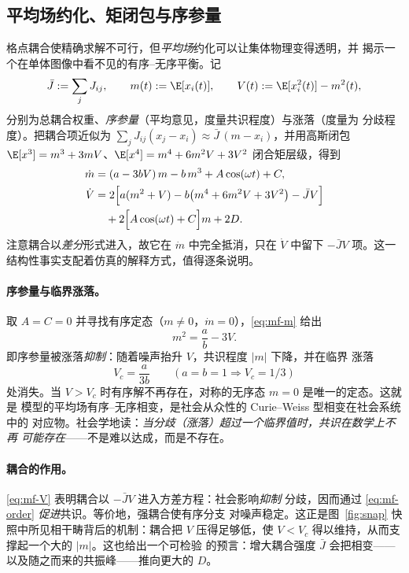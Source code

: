 \subsection{平均场约化、矩闭包与序参量}
\label{sec:theory-mf}
格点耦合使精确求解不可行，但\emph{平均场}约化可以让集体物理变得透明，并
揭示一个在单体图像中看不见的有序--无序平衡。记
\begin{equation}
  \bar J:=\sum_j J_{ij},\qquad
  m(t):=\E[x_i(t)],\qquad
  V(t):=\E[x_i^2(t)]-m^2(t),
  \label{eq:mf-defs}
\end{equation}
分别为总耦合权重、\emph{序参量}（平均意见，度量共识程度）与涨落（度量为
分歧程度）。把耦合项近似为
$\sum_j J_{ij}(x_j-x_i)\approx \bar J\,(m-x_i)$，并用高斯闭包
$\E[x^3]=m^3+3mV$、$\E[x^4]=m^4+6m^2V+3V^2$ 闭合矩层级，得到
\begin{align}
  \dot m &= (a-3bV)\,m-b\,m^{3}+A\cos(\omega t)+C,
  \label{eq:mf-m}\\
  \dot V &= 2\Bigl[a(m^{2}+V)-b\bigl(m^{4}+6m^{2}V+3V^{2}\bigr)-\bar J V\Bigr]
           \nonumber\\
         &\quad +2\Bigl[A\cos(\omega t)+C\Bigr]m+2D .
  \label{eq:mf-V}
\end{align}
注意耦合以\emph{差分}形式进入，故它在 $\dot m$ 中完全抵消，只在 $\dot V$
中留下 $-\bar JV$ 项。这一结构性事实支配着仿真的解释方式，值得逐条说明。

\paragraph{序参量与临界涨落。}
取 $A=C=0$ 并寻找有序定态（$m\neq0$，$\dot m=0$），\eqref{eq:mf-m} 给出
\begin{equation}
  m^{2}=\frac{a}{b}-3V .
  \label{eq:mf-order}
\end{equation}
即序参量被涨落\emph{抑制}：随着噪声抬升 $V$，共识程度 $|m|$ 下降，并在临界
涨落
\begin{equation}
  V_c=\frac{a}{3b}\qquad (a=b=1\Rightarrow V_c=1/3)
  \label{eq:mf-critical}
\end{equation}
处消失。当 $V>V_c$ 时有序解不再存在，对称的无序态 $m=0$ 是唯一的定态。这就是
模型的平均场有序--无序相变，是社会从众性的 Curie--Weiss 型相变在社会系统中的
对应物。社会学地读：\emph{当分歧（涨落）超过一个临界值时，共识在数学上不再
可能存在}——不是难以达成，而是不存在。

\paragraph{耦合的作用。}
\eqref{eq:mf-V} 表明耦合以 $-\bar J V$ 进入方差方程：社会影响\emph{抑制}
分歧，因而通过 \eqref{eq:mf-order} \emph{促进}共识。等价地，强耦合使有序分支
对噪声稳定。这正是图~\ref{fig:snap} 快照中所见相干畴背后的机制：耦合把 $V$
压得足够低，使 $V<V_c$ 得以维持，从而支撑起一个大的 $|m|$。这也给出一个可检验
的预言：增大耦合强度 $\bar J$ 会把相变——以及随之而来的共振峰——推向更大的
$D$。

